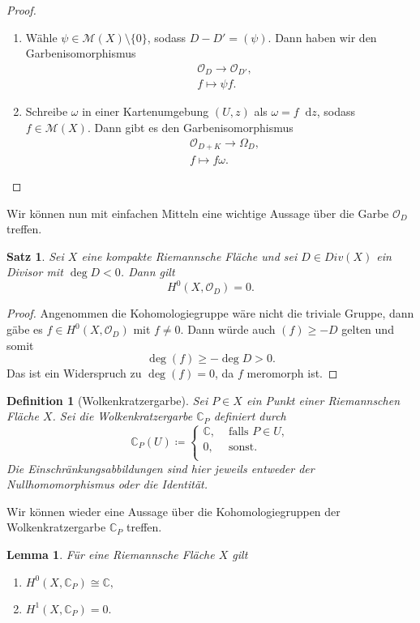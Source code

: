\documentclass[11pt,a4paper,toc=bibliography]{scrartcl}
\theoremstyle{thm}
\newtheorem{satz}{Satz}[section]
\newtheorem{lemma}{Lemma}[section]
\theoremstyle{def}
\newtheorem{defi}{Definition}[section]
\theoremstyle{remark}
\newcommand*\dif{\mathop{}\!\mathrm{d}}\newcommand{\einschraenkung}{\,\rule[-5pt]{0.4pt}{12pt}\,{}} %
\begin{document}
\begin{proof}
	\begin{enumerate}
		\item Wähle $\psi \in \mathcal{M}(X)\setminus \{0\}$, sodass $D-D'=(\psi)$. Dann haben wir den Garbenisomorphismus
		\begin{align*}
			&\mathcal{O}_D\rightarrow \mathcal{O}_{D'},\\
			&f\mapsto \psi f.
		\end{align*}
		\item Schreibe $\omega $ in einer Kartenumgebung $(U,z)$ als $\omega = f\dif z$, sodass $f\in \mathcal{M}(X)$. Dann gibt es den Garbenisomorphismus 
		\begin{align*}
			&\mathcal{O}_{D+K}\rightarrow \Omega_D,\\
			&f\mapsto f\omega.
		\end{align*}
	\end{enumerate}
\end{proof}
Wir können nun mit einfachen Mitteln eine wichtige Aussage über die Garbe $\mathcal{O}_D$ treffen.
\begin{satz}
	Sei $X$ eine kompakte Riemannsche Fläche und sei $D\in Div(X)$ ein Divisor mit $\deg D<0$. Dann gilt
	\[ H^0(X,\mathcal{O}_D)=0.
	\]
\end{satz}
\begin{proof}
	Angenommen die Kohomologiegruppe wäre nicht die triviale Gruppe, dann gäbe es $f\in H^0(X,\mathcal{O}_D)$ mit $f\neq 0$. Dann würde auch $(f)\geq -D$ gelten und somit
	\[
	\deg (f)\geq -\deg D>0.
	\]
	Das ist ein Widerspruch zu $\deg (f)=0$, da $f$ meromorph ist.
\end{proof}
\begin{defi}[Wolkenkratzergarbe]                       
    Sei $P\in X$ ein Punkt einer Riemannschen Fläche $X$. Sei die Wolkenkratzergarbe $\mathbb{C}_P$ definiert durch
    \[
    \mathbb{C}_P(U)\coloneqq \begin{cases}
                           \mathbb{C},&\text{ falls } P\in U,\\
                           0,& \text{ sonst}.\\
                        \end{cases}
    \]
	Die Einschränkungsabbildungen sind hier jeweils entweder der Nullhomomorphismus oder die Identität.
\end{defi}
Wir können wieder eine Aussage über die Kohomologiegruppen der Wolkenkratzergarbe $\mathbb{C}_P$ treffen.
\begin{lemma}
Für eine Riemannsche Fläche $X$ gilt
\begin{enumerate}
    \item $H^0(X,\mathbb{C}_P)\cong \mathbb{C},$
    \item $H^1(X,\mathbb{C}_P) = 0.$ 
\end{enumerate}
    \end{lemma}
\end{document}
